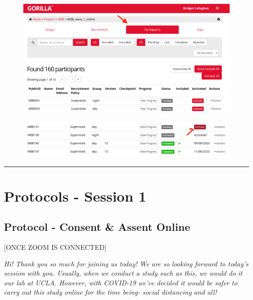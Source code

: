 \documentclass[]{book}
\begin{document}
\begin{figure}
\centering
\includegraphics{images/gorilla/4.png}
\caption{}
\end{figure}

\begin{figure}
\centering
\includegraphics{images/gorilla/5.png}
\caption{}
\end{figure}

\begin{center}\rule{0.5\linewidth}{0.5pt}\end{center}

\hypertarget{protocols---session-1}{%
\section{Protocols - Session 1}\label{protocols---session-1}}

\hypertarget{protocol---consent-assent-online}{%
\subsection{Protocol - Consent \& Assent Online}\label{protocol---consent-assent-online}}

{[}ONCE ZOOM IS CONNECTED{]}

\emph{Hi! Thank you so much for joining us today! We are so looking forward to today's session with you. Usually, when we conduct a study such as this, we would do it our lab at UCLA. However, with COVID-19 we've decided it would be safer to carry out this study online for the time being- social distancing and all!}
\end{document}
